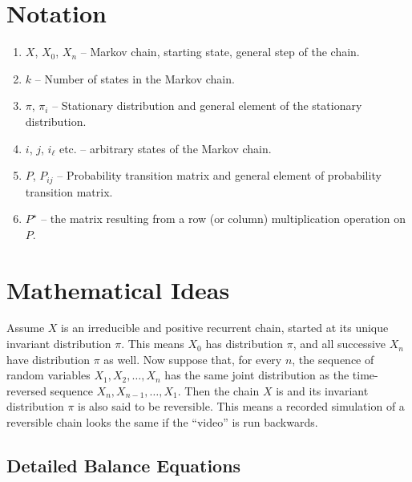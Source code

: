 \documentclass[12pt]{article}
\begin{document}
\section*{Notation}
\begin{enumerate}
    \item
        \( X \), \( X_0 \), \( X_n \) -- Markov chain, starting state,
        general step of the chain.
    \item
        \( k \) -- Number of states in the Markov chain.
    \item
        \( \pi \), \( \pi_i \) -- Stationary distribution and general
        element of the stationary distribution.
    \item
        \( i \), \( j \), \( i_{\ell} \) etc.  -- arbitrary states of
        the Markov chain.
    \item
        \( P \), \( P_{ij} \) -- Probability transition matrix and
        general element of probability transition matrix.
    \item
        \( P^{\star} \) -- the matrix resulting from a row (or column)
        multiplication operation on \( P \).
\end{enumerate}

\hr

\section*{Mathematical Ideas} %

Assume \( X \) is an irreducible and positive recurrent chain, started
at its unique invariant distribution \( \pi \).  This means \( X_0 \)
has distribution \( \pi \), and all successive \( X_n \) have
distribution \( \pi \) as well.  Now suppose that, for every \( n \),
the sequence of random variables \( X_1, X_2, \dots , X_n \) has the
same joint distribution as the time-reversed sequence \( X_n, X_{n-1},
\dots , X_1 \).  Then the chain \( X \) is %
%
and its invariant distribution \( \pi \) is also said to be reversible.
This means a recorded simulation of a reversible chain looks the same if
the ``video'' is run backwards.

\subsection*{Detailed Balance Equations}
\end{document}
